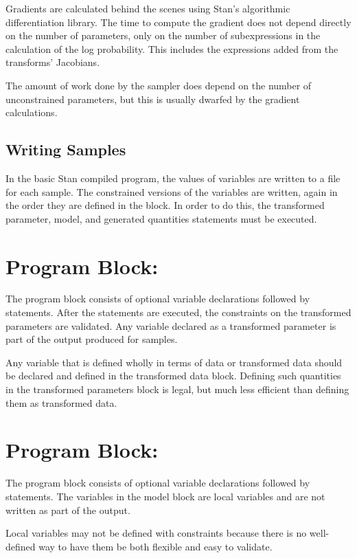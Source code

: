 Gradients are calculated behind the scenes using Stan's algorithmic
differentiation library.  The time to compute the gradient does not
depend directly on the number of parameters, only on the number of
subexpressions in the calculation of the log probability.  This
includes the expressions added from the transforms' Jacobians.  

The amount of work done by the sampler does depend on the number of
unconstrained parameters, but this is usually dwarfed by the gradient
calculations.

\subsection{Writing Samples}

In the basic Stan compiled program, the values of variables are
written to a file for each sample.  The constrained versions of the
variables are written, again in the order they are defined in the
 block.  In order to do this, the transformed
parameter, model, and generated quantities statements must be
executed.  


\section{Program Block: }

The  program block consists of optional
variable declarations followed by statements.  After the statements
are executed, the constraints on the transformed parameters are
validated.  Any variable declared as a transformed parameter is part
of the output produced for samples.

Any variable that is defined wholly in terms of data or transformed
data should be declared and defined in the transformed data block.
Defining such quantities in the transformed parameters block is legal,
but much less efficient than defining them as transformed data.

\section{Program Block: }

The  program block consists of optional variable
declarations followed by statements.  The variables in the model block
are local variables and are not written as part of the output.  

Local variables may not be defined with constraints because there is
no well-defined way to have them be both flexible and easy to
validate.


